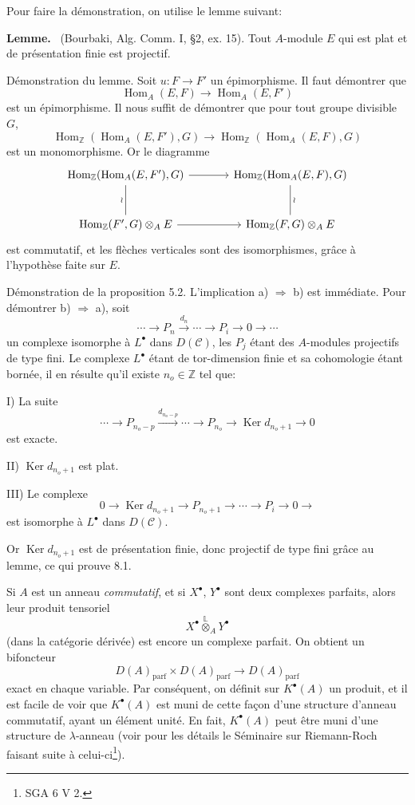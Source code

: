 \documentclass[11pt]{article}
\newenvironment{statement}[1]{\par\medskip\noindent\textbf{#1.}\ }{\par\medskip}
\DeclareMathOperator{\Hom}{Hom}
\providecommand{\Ker}{\operatorname{Ker}}
\providecommand{\parf}{\mathrm{parf}}
\providecommand{\Hom}{\operatorname{Hom}}
\providecommand{\cC}{\mathcal C}
\providecommand{\Ker}{\operatorname{Ker}}
\providecommand{\Ker}{\operatorname{Ker}}
\providecommand{\cC}{\mathcal C}
\providecommand{\parf}{\mathrm{parf}}
\providecommand{\Hom}{\operatorname{Hom}}
\begin{document}
Pour faire la démonstration, on utilise le lemme suivant:

\begin{statement}{Lemme}
(Bourbaki, Alg. Comm. I, §2, ex. 15). Tout $A$-module $E$ qui est plat et de présentation finie est projectif.
\end{statement}

Démonstration du lemme. Soit $u:F\to F'$ un épimorphisme. Il faut démontrer que
\[
\Hom_A(E,F)\longrightarrow\Hom_A(E,F')
\]
est un épimorphisme. Il nous suffit de démontrer que pour tout groupe divisible $G$,
\[
\Hom_{\mathbb Z}(\Hom_A(E,F'),G)\longrightarrow
\Hom_{\mathbb Z}(\Hom_A(E,F),G)
\]
est un monomorphisme. Or le diagramme
\[
\begin{tikzcd}[column sep=large,row sep=large]
\Hom_{\mathbb Z}(\Hom_A(E,F'),G)
 \arrow[r]\arrow[d,dash,"\wr"']&
\Hom_{\mathbb Z}(\Hom_A(E,F),G)\arrow[d,dash,"\wr"]\\
\Hom_{\mathbb Z}(F',G)\otimes_A E
 \arrow[r]&
\Hom_{\mathbb Z}(F,G)\otimes_A E
\end{tikzcd}
\]
est commutatif, et les flèches verticales sont des isomorphismes, grâce à l'hypothèse faite sur $E$.

Démonstration de la proposition 5.2. L'implication a) $\Rightarrow$ b) est immédiate. Pour démontrer b) $\Rightarrow$ a), soit
\[
\cdots\longrightarrow P_n\xrightarrow{d_n}\cdots\longrightarrow P_i\longrightarrow 0\longrightarrow\cdots
\]
un complexe isomorphe à $L^\bullet$ dans $D(\cC)$, les $P_j$ étant des $A$-modules projectifs de type fini. Le complexe $L^\bullet$ étant de tor-dimension finie et sa cohomologie étant bornée, il en résulte qu'il existe $n_o\in\mathbb Z$ tel que:

I) La suite
\[
\cdots\longrightarrow P_{n_o-p}\xrightarrow{d_{n_o-p}}\cdots\longrightarrow
P_{n_o}\longrightarrow \Ker d_{n_o+1}\longrightarrow0
\]
est exacte.

II) $\Ker d_{n_o+1}$ est
plat.

III) Le complexe
\[
0\longrightarrow \Ker d_{n_o+1}\longrightarrow P_{n_o+1}\longrightarrow\cdots\longrightarrow P_i\longrightarrow0\longrightarrow
\]
est isomorphe à $L^\bullet$ dans $D(\cC)$.

Or $\Ker d_{n_o+1}$ est de présentation finie, donc projectif de type fini grâce au lemme, ce qui prouve 8.1.

Si $A$ est un anneau \emph{commutatif}, et si $X^\bullet$, $Y^\bullet$ sont deux complexes parfaits, alors leur produit tensoriel
\[
X^\bullet\overset{\mathbb L}{\otimes}_A Y^\bullet
\]
(dans la catégorie dérivée) est encore un complexe parfait. On obtient un bifoncteur
\[
D(A)_{\parf}\times D(A)_{\parf}\longrightarrow D(A)_{\parf}
\]
exact en chaque variable. Par conséquent, on définit sur $K^{\bullet}(A)$ un produit, et il est facile de voir que $K^{\bullet}(A)$ est muni de cette façon d'une structure d'anneau commutatif, ayant un élément unité. En fait, $K^{\bullet}(A)$ peut être muni d'une structure de $\lambda$-anneau (voir pour les détails le Séminaire sur Riemann-Roch faisant suite à celui-ci\footnote{SGA 6 V 2.}).
\end{document}
